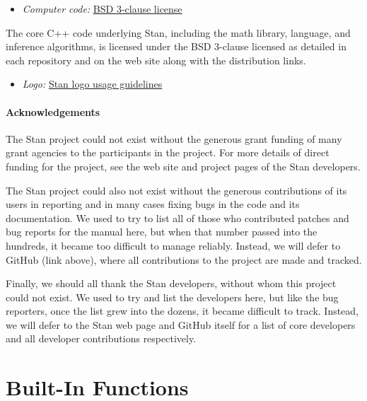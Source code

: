 \documentclass[
  10pt,
]{book}
\providecommand{\tightlist}{%
  \setlength{\itemsep}{0pt}\setlength{\parskip}{0pt}}
\begin{document}
\begin{itemize}
\tightlist
\item
  \emph{Computer code:} \href{https://opensource.org/licenses/BSD-3-Clause}{BSD 3-clause license}
\end{itemize}

The core C++ code underlying Stan, including the math library,
language, and inference algorithms, is licensed under the BSD 3-clause
licensed as detailed in each repository and on the web site along
with the distribution links.

\begin{itemize}
\tightlist
\item
  \emph{Logo:} \href{https://mc-stan.org/about/logo/}{Stan logo usage guidelines}
\end{itemize}

\hypertarget{acknowledgements}{%
\subsubsection*{Acknowledgements}\label{acknowledgements}}

The Stan project could not exist without the generous grant
funding of many grant agencies to the participants in the project.
For more details of direct funding for the project, see the web site
and project pages of the Stan developers.

The Stan project could also not exist without the generous
contributions of its users in reporting and in many cases fixing bugs
in the code and its documentation. We used to try to list all of
those who contributed patches and bug reports for the manual here, but
when that number passed into the hundreds, it became too difficult to
manage reliably. Instead, we will defer to GitHub (link above), where
all contributions to the project are made and tracked.

Finally, we should all thank the Stan developers, without whom this
project could not exist. We used to try and list the developers here,
but like the bug reporters, once the list grew into the dozens, it
became difficult to track. Instead, we will defer to the Stan web
page and GitHub itself for a list of core developers and all developer
contributions respectively.

\pagestyle{headings}
\mainmatter

\hypertarget{built-in-functions}{%
\chapter*{Built-In Functions}\label{built-in-functions}}
\end{document}
